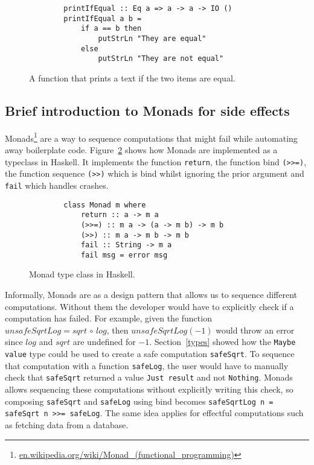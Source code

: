 \begin{figure}[H]
    \begin{lstlisting}
        printIfEqual :: Eq a => a -> a -> IO ()
        printIfEqual a b =
            if a == b then
                putStrLn "They are equal"
            else
                putStrLn "They are not equal"
    \end{lstlisting}
    \caption{A function that prints a text if the two items are equal.}
    \label{printifequal}
\end{figure}


\subsection{Brief introduction to Monads for side effects}\label{monads}

Monads\footnote{\url{en.wikipedia.org/wiki/Monad_(functional_programming)}} are
a way to sequence computations that might fail while automating away boilerplate
code. Figure~\ref{monadclass} shows how Monads are implemented as a typeclass in
Haskell. It implements the function \texttt{return}, the function bind
\texttt{(>>=)}, the function sequence \texttt{(>>)} which is bind whilst
ignoring the prior argument and \texttt{fail} which handles crashes.

\begin{figure}[H]
    \begin{lstlisting}
        class Monad m where  
            return :: a -> m a  
            (>>=) :: m a -> (a -> m b) -> m b  
            (>>) :: m a -> m b -> m b  
            fail :: String -> m a  
            fail msg = error msg 
    \end{lstlisting}
    \caption{Monad type class in Haskell.}
    \label{monadclass}
\end{figure}

Informally, Monads are as a design pattern that allows us to sequence different
computations. Without them the developer would have to explicitly check if a
computation has failed. For example, given the function $unsafeSqrtLog =
sqrt\,\circ\,log$, then $unsafeSqrtLog(-1)$ would throw an error since $log$ and
$sqrt$ are undefined for $-1$.  Section~\ref{types} showed how the \texttt{Maybe
value} type could be used to create a safe computation \texttt{safeSqrt}.  To
sequence that computation with a function \texttt{safeLog}, the user would have
to manually check that \texttt{safeSqrt} returned a value \texttt{Just result}
and not \texttt{Nothing}. Monads allows sequencing these computations without
explicitly writing this check, so composing \texttt{safeSqrt} and
\texttt{safeLog} using bind becomes \texttt{safeSqrtLog n = safeSqrt n >>=
safeLog}. The same idea applies for effectful computations such as fetching data
from a database.


